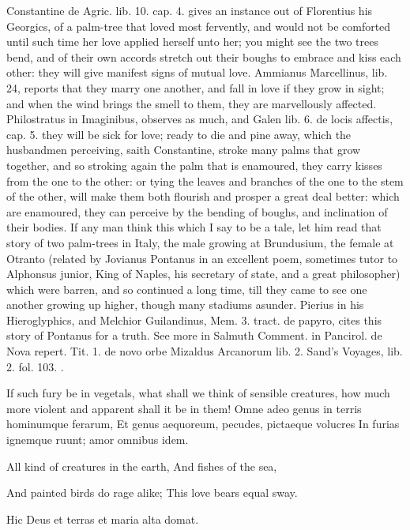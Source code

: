 {Constantine de Agric. lib. 10. cap. 4. gives an instance out of
Florentius his Georgics, of a palm-tree that loved most fervently,
 and would not be comforted until such time her love applied
herself unto her; you might see the two trees bend, and of their own
accords stretch out their boughs to embrace and kiss each other: they
will give manifest signs of mutual love. Ammianus Marcellinus, lib. 24,
reports that they marry one another, and fall in love if they grow in
sight; and when the wind brings the smell to them, they are
marvellously affected. Philostratus in Imaginibus, observes as much,
and Galen lib. 6. de locis affectis, cap. 5. they will be sick for
love; ready to die and pine away, which the husbandmen perceiving,
saith Constantine, stroke many palms that grow together, and so
stroking again the palm that is enamoured, they carry kisses from the
one to the other: or tying the leaves and branches of the one to the
stem of the other, will make them both flourish and prosper a great
deal better: which are enamoured, they can perceive by the
bending of boughs, and inclination of their bodies. If any man think
this which I say to be a tale, let him read that story of two
palm-trees in Italy, the male growing at Brundusium, the female at
Otranto (related by Jovianus Pontanus in an excellent poem, sometimes
tutor to Alphonsus junior, King of Naples, his secretary of state, and
a great philosopher) which were barren, and so continued a long time,
till they came to see one another growing up higher, though many
stadiums asunder. Pierius in his Hieroglyphics, and Melchior
Guilandinus, Mem. 3. tract. de papyro, cites this story of Pontanus for
a truth. See more in Salmuth Comment. in Pancirol. de Nova repert. Tit.
1. de novo orbe Mizaldus Arcanorum lib. 2. Sand's Voyages, lib. 2. fol.
103. \etc{}.

If such fury be in vegetals, what shall we think of sensible creatures,
how much more violent and apparent shall it be in them!
Omne adeo genus in terris hominumque ferarum,
Et genus aequoreum, pecudes, pictaeque volucres
In furias ignemque ruunt; amor omnibus idem.


All kind of creatures in the earth,
And fishes of the sea,

And painted birds do rage alike;
This love bears equal sway.


Hic Deus et terras et maria alta domat.

}
